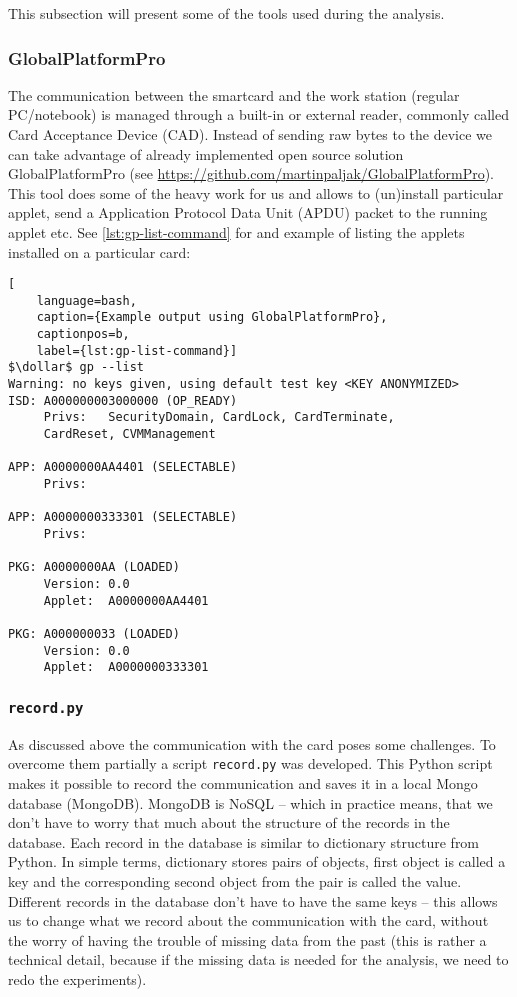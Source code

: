 \documentclass[a4paper]{scrartcl}
\newcommand{\dollar}{\mbox{\textdollar}}
\begin{document}
This subsection will present some of the tools used during the analysis.

\subsubsection{GlobalPlatformPro}

The communication between the smartcard and the work station (regular PC/notebook) is managed through a built-in or external reader, commonly called Card Acceptance Device (CAD). Instead of sending raw bytes to the device we can take advantage of already implemented open source solution GlobalPlatformPro (see \url{https://github.com/martinpaljak/GlobalPlatformPro}). This tool does some of the heavy work for us and allows to (un)install particular applet, send a Application Protocol Data Unit (APDU) packet to the running applet etc. See \ref{lst:gp-list-command} for and example of listing the applets installed on a particular card:
\begin{lstlisting}[
    language=bash,
    caption={Example output using GlobalPlatformPro},
    captionpos=b,
    label={lst:gp-list-command}]
$\dollar$ gp --list
Warning: no keys given, using default test key <KEY ANONYMIZED>
ISD: A000000003000000 (OP_READY)
     Privs:   SecurityDomain, CardLock, CardTerminate,
     CardReset, CVMManagement

APP: A0000000AA4401 (SELECTABLE)
     Privs:

APP: A0000000333301 (SELECTABLE)
     Privs:

PKG: A0000000AA (LOADED)
     Version: 0.0
     Applet:  A0000000AA4401

PKG: A000000033 (LOADED)
     Version: 0.0
     Applet:  A0000000333301
\end{lstlisting}

\subsubsection{\texttt{record.py}}

As discussed above the communication with the card poses some challenges. To overcome them partially a script \texttt{record.py} was developed. This Python script makes it possible to record the communication and saves it in a local Mongo database (MongoDB). MongoDB is NoSQL -- which in practice means, that we don't have to worry that much about the structure of the records in the database. Each record in the database is similar to dictionary structure from Python. In simple terms, dictionary stores pairs of objects, first object is called a key and the corresponding second object from the pair is called the value. Different records in the database don't have to have the same keys -- this allows us to change what we record about the communication with the card, without the worry of having the trouble of missing data from the past (this is rather a technical detail, because if the missing data is needed for the analysis, we need to redo the experiments).
\end{document}
